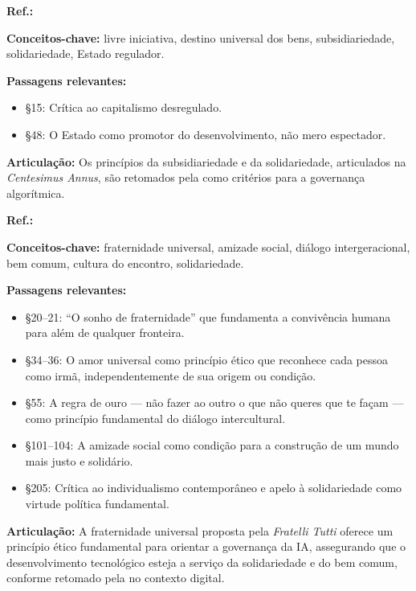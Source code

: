 \begin{fichamento}
    \textbf{Ref.:} \cite{JoaoPauloII1991CA}
    
    \textbf{Conceitos-chave:} livre iniciativa, destino universal dos bens, subsidiariedade, solidariedade, Estado regulador.
    
    \textbf{Passagens relevantes:}
    \begin{itemize}
        \item §15: Crítica ao capitalismo desregulado.
        \item §48: O Estado como promotor do desenvolvimento, não mero espectador.
    \end{itemize}
    
    \textbf{Articulação:} Os princípios da subsidiariedade e da solidariedade, articulados na \textit{Centesimus Annus}, são retomados pela \MH{} como critérios para a governança algorítmica.
\end{fichamento}

\begin{fichamento}
    \textbf{Ref.:} \cite{Francisco2020FT}
    
    \textbf{Conceitos-chave:} fraternidade universal, amizade social, diálogo intergeracional, bem comum, cultura do encontro, solidariedade.
    
    \textbf{Passagens relevantes:}
    \begin{itemize}
        \item §20–21: ``O sonho de fraternidade'' que fundamenta a convivência humana para além de qualquer fronteira.
        \item §34–36: O amor universal como princípio ético que reconhece cada pessoa como irmã, independentemente de sua origem ou condição.
        \item §55: A regra de ouro — não fazer ao outro o que não queres que te façam — como princípio fundamental do diálogo intercultural.
        \item §101–104: A amizade social como condição para a construção de um mundo mais justo e solidário.
        \item §205: Crítica ao individualismo contemporâneo e apelo à solidariedade como virtude política fundamental.
    \end{itemize}
    
    \textbf{Articulação:} A fraternidade universal proposta pela \textit{Fratelli Tutti} oferece um princípio ético fundamental para orientar a governança da IA, assegurando que o desenvolvimento tecnológico esteja a serviço da solidariedade e do bem comum, conforme retomado pela \MH{} no contexto digital.
\end{fichamento}

